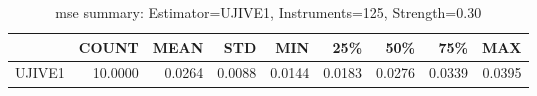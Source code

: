 \begin{table}[ht]
\centering
\caption{mse summary: Estimator=UJIVE1, Instruments=125, Strength=0.30}
\begin{tabular}{lrrrrrrrr}
\toprule
 & COUNT & MEAN & STD & MIN & 25\% & 50\% & 75\% & MAX \\
\midrule
UJIVE1 & 10.0000 & 0.0264 & 0.0088 & 0.0144 & 0.0183 & 0.0276 & 0.0339 & 0.0395 \\
\bottomrule
\end{tabular}
\end{table}

